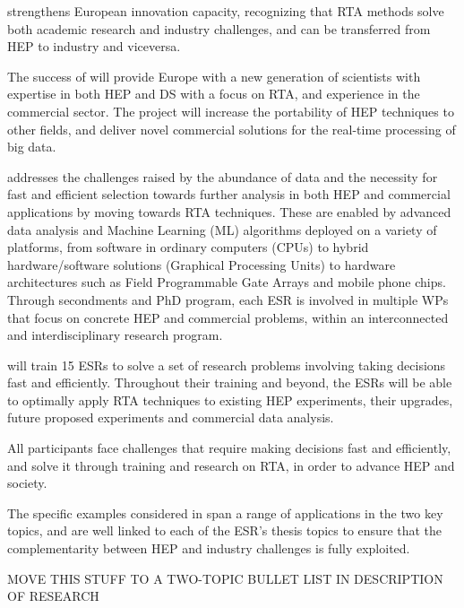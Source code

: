 \acronym strengthens European innovation capacity, 
recognizing that RTA methods solve both academic research and 
industry challenges, and can be transferred from HEP to industry and viceversa.

The success of \acronym  will provide Europe with a new generation of scientists with 
expertise in both HEP and DS with a focus on RTA, and experience in the commercial sector. 
The project will increase the portability of HEP techniques to 
other fields, and deliver novel commercial solutions for the real-time processing of big data.


\acronym addresses the challenges raised by the abundance of data 
and the necessity for fast and efficient selection towards further analysis in
both HEP and commercial applications by moving towards RTA techniques.
These are enabled by advanced data analysis and Machine Learning (ML) algorithms 
deployed on a variety of platforms, from software in ordinary computers (CPUs) 
to hybrid hardware/software solutions (Graphical Processing Units) to hardware architectures
such as Field Programmable Gate Arrays and mobile phone chips. %
Through secondments and PhD program, 
each ESR is involved in multiple WPs that focus on concrete HEP and commercial problems,
within an interconnected and interdisciplinary research program. 

\acronym will train 15 ESRs to solve a set of research problems involving 
taking decisions fast and efficiently. Throughout their training and beyond, 
the ESRs will be able to optimally apply RTA techniques 
to existing HEP experiments, their upgrades, future proposed experiments
and commercial data analysis. 

All \acronym participants face challenges that require making decisions fast and efficiently, 
and solve it through training and research on RTA, in order to advance HEP and society. 


The specific examples considered in \acronym 
span a range of applications in the two key topics, and are well linked to each of the ESR's thesis topics to ensure
that the complementarity between HEP and industry challenges is fully exploited. 

MOVE THIS STUFF TO A TWO-TOPIC BULLET LIST IN DESCRIPTION OF RESEARCH


